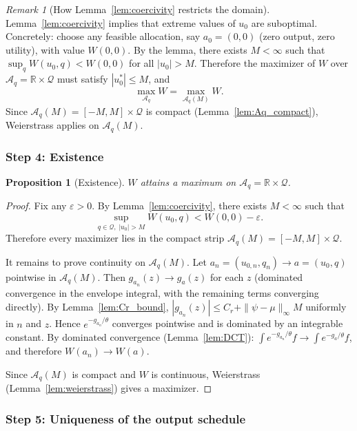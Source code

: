\documentclass[12pt,a4paper]{article}
\theoremstyle{definition}
\theoremstyle{plain}
\newtheorem{proposition}{Proposition}[section]
\theoremstyle{remark}
\newtheorem{remark}{Remark}[section]
\newcommand{\R}{\mathbb{R}}
\newcommand{\calA}{\mathcal{A}}
\begin{document}
\begin{remark}[How Lemma~\ref{lem:coercivity} restricts the domain]
\label{rem:coercivity_use}
Lemma~\ref{lem:coercivity} implies that extreme values of $u_0$
are suboptimal.  Concretely: choose any feasible
allocation, say $a_0 = (0, 0)$ (zero output, zero
utility), with value $W(0, 0)$.  By the lemma, there
exists $M < \infty$ such that
$\sup_q W(u_0, q) < W(0, 0)$ for all $|u_0| > M$.
Therefore the maximizer of $W$ over
$\calA_q = \R \times \mathcal{Q}$ must satisfy
$|u_0^*| \leq M$, and
\[
  \max_{\calA_q} W = \max_{\calA_q(M)} W.
\]
Since $\calA_q(M) = [-M, M] \times \mathcal{Q}$ is
compact (Lemma~\ref{lem:Aq_compact}), Weierstrass
applies on $\calA_q(M)$.
\end{remark}


\subsubsection{Step 4: Existence}

\begin{proposition}[Existence]
\label{prop:existence}
$W$ attains a maximum on $\calA_q = \R \times \mathcal{Q}$.
\end{proposition}

\begin{proof}
Fix any $\varepsilon > 0$.
By Lemma~\ref{lem:coercivity}, there exists $M < \infty$ such that
\[
  \sup_{q \in \mathcal{Q},\; |u_0| > M} W(u_0, q)
  < W(0, 0) - \varepsilon.
\]
Therefore every maximizer lies in the compact strip
$\calA_q(M) = [-M, M] \times \mathcal{Q}$.

It remains to prove continuity on $\calA_q(M)$.
Let $a_n = (u_{0,n}, q_n) \to a = (u_0, q)$ pointwise
in $\calA_q(M)$.  Then
$g_{a_n}(z) \to g_a(z)$ for each $z$
(dominated convergence in the envelope integral, with the
remaining terms converging directly).
By Lemma~\ref{lem:Cr_bound},
$|g_{a_n}(z)| \leq C_r + \|\psi - \mu\|_\infty M$
uniformly in $n$ and $z$.  Hence
$e^{-g_{a_n}/\theta}$ converges pointwise and is
dominated by an integrable constant.  By dominated
convergence (Lemma~\ref{lem:DCT}):
$\int e^{-g_{a_n}/\theta}f \to \int e^{-g_a/\theta}f$,
and therefore $W(a_n) \to W(a)$.

Since $\calA_q(M)$ is compact and $W$ is continuous,
Weierstrass (Lemma~\ref{lem:weierstrass}) gives a
maximizer.
\end{proof}


\subsubsection{Step 5: Uniqueness of the output schedule}
\end{document}

